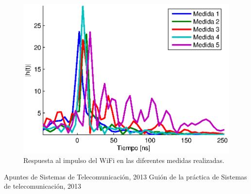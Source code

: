 \documentclass[10pt,conference,a4paper]{IEEEtran}
\begin{document}
\begin{figure}[htb]
    \centering
    \includegraphics[width=\columnwidth]{figuras/respuesta_impulso_wifi.eps}
    \caption{Respuesta al impulso del WiFi en las diferentes medidas realizadas.}
    \label{fig:respuesta_impulso_wifi}
\end{figure}

\newpage
\begin{thebibliography}{2}                                                 %
    Apuntes de Sistemas de Telecomunicación, 2013
    Guión de la práctica de Sistemas de telecomunicación, 2013
\end{thebibliography}
\end{document}
